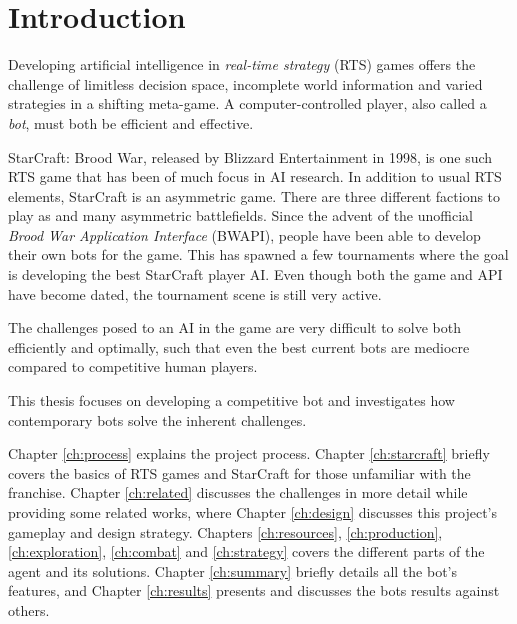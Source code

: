 \chapter{Introduction}
Developing artificial intelligence in \emph{real-time strategy} (RTS) games offers the challenge of limitless decision space, incomplete world information and varied strategies in a shifting meta-game. A computer-controlled player, also called a \emph{bot}, must both be efficient and effective.

StarCraft: Brood War, released by Blizzard Entertainment in 1998, is one such RTS game that has been of much focus in AI research. In addition to usual RTS elements, StarCraft is an asymmetric game. There are three different factions to play as and many asymmetric battlefields. Since the advent of the unofficial \emph{Brood War Application Interface} (BWAPI), people have been able to develop their own bots for the game. This has spawned a few tournaments where the goal is developing the best StarCraft player AI. Even though both the game and API have become dated, the tournament scene is still very active.

The challenges posed to an AI in the game are very difficult to solve both efficiently and optimally, such that even the best current bots are mediocre compared to competitive human players.

This thesis focuses on developing a competitive bot and investigates how contemporary bots solve the inherent challenges.

Chapter \ref{ch:process} explains the project process. Chapter \ref{ch:starcraft} briefly covers the basics of RTS games and StarCraft for those unfamiliar with the franchise. Chapter \ref{ch:related} discusses the challenges in more detail while providing some related works, where Chapter \ref{ch:design} discusses this project's gameplay and design strategy. Chapters \ref{ch:resources}, \ref{ch:production}, \ref{ch:exploration}, \ref{ch:combat} and \ref{ch:strategy} covers the different parts of the agent and its solutions. Chapter \ref{ch:summary} briefly details all the bot's features, and Chapter \ref{ch:results} presents and discusses the bots results against others.
